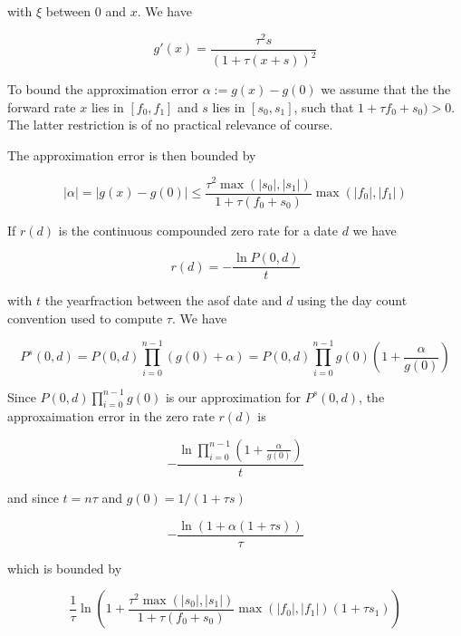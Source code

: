 \documentclass[12pt, a4paper]{article}
\begin{document}
with $\xi$ between $0$ and $x$. We have

\begin{equation}
  g'(x) = \frac{\tau^2s}{(1+\tau(x+s))^2}
\end{equation}

To bound the approximation error $\alpha := g(x) - g(0)$ we assume that the the forward rate $x$ lies in $[f_0, f_1]$
and $s$ lies in $[s_0, s_1]$, such that $1+\tau f_0 + s_0) > 0$. The latter restriction is of no practical relevance of
course.

The approximation error is then bounded by

\begin{equation}
  | \alpha | =| g(x) - g(0) | \leq \frac{\tau^2 \max(|s_0|, |s_1|)}{1+\tau(f_0+s_0)} \max(|f_0|, |f_1|)
\end{equation}

If $r(d)$ is the continuous compounded zero rate for a date $d$ we have

\begin{equation}
 r(d) = - \frac{\ln P(0,d)}{t}
\end{equation}

with $t$ the yearfraction between the asof date and $d$ using the day count convention used to compute $\tau$. We have

\begin{equation}
P^s(0,d) = P(0,d) \prod_{i=0}^{n-1} (g(0) + \alpha) = P(0,d) \prod_{i=0}^{n-1} g(0) \left( 1 + \frac{\alpha}{g(0)} \right)
\end{equation}

Since $P(0,d) \prod_{i=0}^{n-1} g(0)$ is our approximation for $P^s(0,d)$, the approxaimation error in the zero rate
$r(d)$ is

\begin{equation}
-\frac{\ln \prod_{i=0}^{n-1}  \left( 1 + \frac{\alpha}{g(0)} \right)}{t}
\end{equation}

and since $t = n \tau$ and $g(0) = 1 / ( 1 + \tau s )$

\begin{equation}
 -\frac{ \ln ( 1 + \alpha ( 1+\tau s ))} { \tau }
\end{equation}

which is bounded by

\begin{equation}\label{error_bound}
  \frac{1}{\tau} \ln \left( 1 + \frac{\tau^2 \max(|s_0|, |s_1|)}{1+\tau(f_0+s_0)} \max(|f_0|, |f_1|)  ( 1+\tau s_1 ) \right)
\end{equation}
\end{document}
